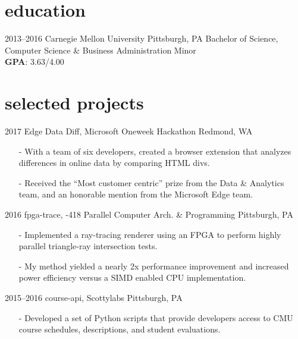 \documentclass[print]{template/friggeri-cv}
\begin{document}
    \section{education}

    \begin{entrylist}
        \entry
            {2013--2016}
            {Carnegie Mellon University}
            {Pittsburgh, PA}
            {Bachelor of Science, Computer Science \& Business Administration Minor\\
            \textbf{GPA}: 3.63/4.00}
    \end{entrylist}

    \section{selected projects}

    \begin{entrylist}
        \entrys
            {2017}
            {Edge Data Diff, {\normalfont Microsoft Oneweek Hackathon}}
            {Redmond, WA}
            {\begin{itemize}[leftmargin=*]
                \item[-] With a team of six developers, created a browser extension that analyzes differences in online data by comparing HTML divs.
                \item[-] Received the ``Most customer centric'' prize from the Data \& Analytics team, and an honorable mention from the Microsoft Edge team.
            \end{itemize}}
        \entrys
            {2016}
            {fpga-trace, {-418 Parallel Computer Arch. \& Programming}}
            {Pittsburgh, PA}
            {\begin{itemize}[leftmargin=*]
                \item[-] Implemented a ray-tracing renderer using an FPGA to perform highly parallel triangle-ray intersection tests.
                \item[-] My method yielded a nearly 2x performance improvement and increased power efficiency versus a SIMD enabled CPU implementation.
            \end{itemize}}
        \entrys
            {2015--2016}
            {course-api, {\normalfont Scottylabs}}
            {Pittsburgh, PA}
            {\begin{itemize}[leftmargin=*]
                \item[-] Developed a set of Python scripts that provide developers access to CMU course schedules, descriptions, and student evaluations.
            \end{itemize}}
    \end{entrylist}
\end{document}
